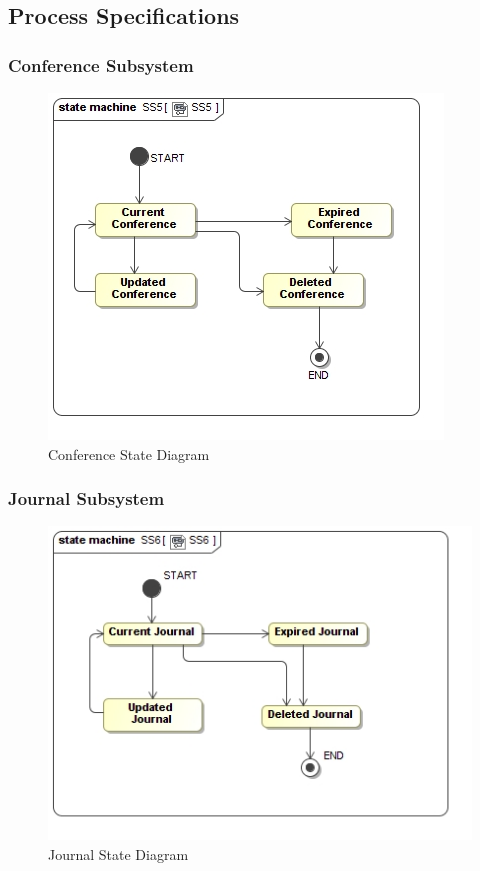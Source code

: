 \documentclass{article}
\begin{document}
		\subsection{Process Specifications}
			\subsubsection{Conference Subsystem}
				\begin{figure}
					\includegraphics[width=\textwidth]{5.4-SS5-7/SS5}
					\caption{Conference State Diagram}
				\end{figure}
			\subsubsection{Journal Subsystem}
				\begin{figure}
					\includegraphics[width=\textwidth]{5.4-SS5-7/SS6}
					\caption{Journal State Diagram}
				\end{figure}
\end{document}
